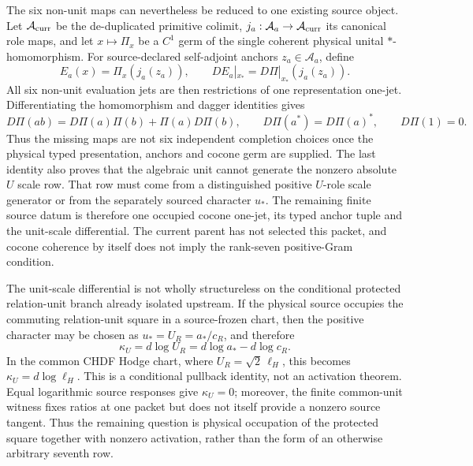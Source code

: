 The six non-unit maps can nevertheless be reduced to one existing source
object.  Let $\mathcal A_{\rm curr}$ be the de-duplicated primitive colimit,
$j_a:\mathcal A_a\to\mathcal A_{\rm curr}$ its canonical role maps, and let
$x\mapsto\Pi_x$ be a $C^1$ germ of the single coherent physical unital
$*$-homomorphism.  For source-declared self-adjoint anchors
$z_a\in\mathcal A_a$, define
\begin{equation}
E_a(x)=\Pi_x(j_a(z_a)),
\qquad
DE_a|_{x_*}=D\Pi|_{x_*}(j_a(z_a)).
\label{eq:p3coconejet}
\end{equation}
All six non-unit evaluation jets are then restrictions of one representation
one-jet.  Differentiating the homomorphism and dagger identities gives
\begin{equation}
D\Pi(ab)=D\Pi(a)\Pi(b)+\Pi(a)D\Pi(b),
\qquad D\Pi(a^*)=D\Pi(a)^*,
\qquad D\Pi(1)=0.
\label{eq:p3coconelinearized}
\end{equation}
Thus the missing maps are not six independent completion choices once the
physical typed presentation, anchors and cocone germ are supplied.  The last
identity also proves that the algebraic unit cannot generate the nonzero
absolute $U$ scale row.  That row must come from a distinguished positive
$U$-role scale generator or from the separately sourced character $u_*$.  The
remaining finite source datum is therefore one occupied cocone one-jet, its
typed anchor tuple and the unit-scale differential.  The current parent has
not selected this packet, and cocone coherence by itself does not imply the
rank-seven positive-Gram condition.

The unit-scale differential is not wholly structureless on the conditional
protected relation-unit branch already isolated upstream.  If the physical
source occupies the commuting relation-unit square in a source-frozen chart,
then the positive character may be chosen as
$u_*=U_R=a_*/c_R$, and therefore
\begin{equation}
 \boxed{\kappa_U=d\log U_R=d\log a_*-d\log c_R.}
 \label{eq:p3relationscalepullback}
\end{equation}
In the common CHDF Hodge chart, where $U_R=\sqrt2\,\ell_H$, this becomes
$\kappa_U=d\log\ell_H$.  This is a conditional pullback identity, not an
activation theorem.  Equal logarithmic source responses give
$\kappa_U=0$; moreover, the finite common-unit witness fixes ratios at one
packet but does not itself provide a nonzero source tangent.  Thus the
remaining question is physical occupation of the protected square together
with nonzero activation, rather than the form of an otherwise arbitrary
seventh row.

